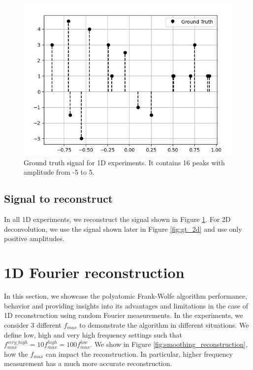 \documentclass[a4paper,12pt,oneside]{report}
\theoremstyle{named}
\begin{document}
\begin{figure}
\centering
\includegraphics[width=1\linewidth]{GT.png}
\caption{Ground truth signal for 1D experiments. It contains 16 peaks with amplitude from -5 to 5.}
\label{fig:GT}
\end{figure}

\subsection{Signal to reconstruct}
In all 1D experiments, we reconstruct the signal shown in Figure \ref{fig:GT}. For 2D deconvolution, we use the signal shown later in Figure \ref{fig:gt_2d} and use only positive amplitudes. 

\section{1D Fourier reconstruction}
In this section, we showcase the polyatomic Frank-Wolfe algorithm performance, behavior and providing insights into its advantages and limitations in the case of 1D reconstruction using random Fourier measurements. In the experiments, we consider 3 different $f_{max}$ to demonstrate the algorithm in different situations. We define low, high and very high frequency settings such that $f_{max}^{very\_high} = 10 f_{max}^{high} = 100 f_{max}^{low}$. We show in Figure \ref{fig:smoothing_reconstruction}, how the $f_{max}$ can impact the reconstruction. In particular, higher frequency measurement has a much more accurate reconstruction. 
\end{document}
